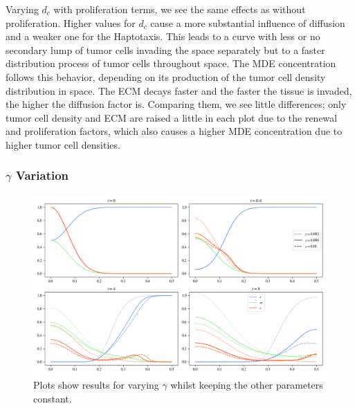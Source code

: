 Varying $d_c$ with proliferation terms, we see the same effects as without proliferation. Higher values for $d_c$ cause a more substantial influence of diffusion and a weaker one for the Haptotaxis. This leads to a curve with less or no secondary lump of tumor cells invading the space separately but to a faster distribution process of tumor cells throughout space. The MDE concentration follows this behavior, depending on its production of the tumor cell density distribution in space. The ECM decays faster and the faster the tissue is invaded, the higher the diffusion factor is. Comparing them, we see little differences; only tumor cell density and ECM are raised a little in each plot due to the renewal and proliferation factors, which also causes a higher MDE concentration due to higher tumor cell densities.


\subsubsection*{$\gamma$ Variation}

\begin{figure}[h]
    \centering
    \includegraphics[width=\textwidth]{resources/images/prolif_gamma_variation.png}
    \caption{Plots show results for varying $\gamma$ whilst keeping the other parameters constant.}
    \label{fig:prolif_gamma_variation}
\end{figure}

